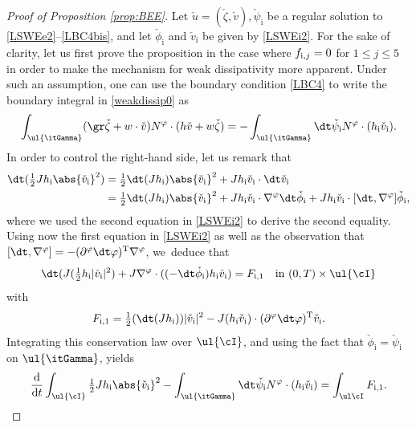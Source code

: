 \begin{proof}[Proof of Proposition \ref{prop:BEE}]
Let $\check{u}=(\check{\zeta},\check{v}), \check{\psi}_\mathrm{i}$ be a regular solution to \eqref{LSWEe2}--\eqref{LBC4bis},
and let $\check{\phi}_\mathrm{i}$ and $\check{v}_\mathrm{i}$ be given by \eqref{LSWEi2}.
For the sake of clarity, let us first prove the proposition in the case where $f_{{\rm i},j}=0$ for $1\leq j\leq 5$
in order to make the mechanism for weak dissipativity more apparent.
Under such an assumption, one can use the boundary condition \eqref{LBC4} to write the boundary integral in \eqref{weakdissip0} as
\begin{equation}\label{weakdissip1}
\int_{\ul{\itGamma}} (\gr \check{\zeta}+w\cdot\check{v})N^\varphi\cdot (h \check{v}+w\check{\zeta})
= -\int_{\ul{\itGamma}} \dt \check{\psi}_\mathrm{i} N^\varphi\cdot (h_\mathrm{i}\check{v}_\mathrm{i}).
\end{equation}
In order to control the right-hand side, let us remark that
\begin{align*}
\dt (\tfrac{1}{2}Jh_\mathrm{i}\abs{\check{v}_\mathrm{i}}^2)
&= \tfrac{1}{2}\dt(J h_\mathrm{i}) \abs{\check{v}_\mathrm{i}}^2+J h_\mathrm{i}\check{v}_\mathrm{i}\cdot \dt \check{v}_\mathrm{i} \\
&= \tfrac{1}{2}\dt(J h_\mathrm{i}) \abs{\check{v}_\mathrm{i}}^2+J h_\mathrm{i}\check{v}_\mathrm{i}\cdot \nabla^\varphi \dt \check{\phi}_\mathrm{i}
+ J h_\mathrm{i}\check{v}_\mathrm{i}\cdot [\dt,\nabla^\varphi] \check{\phi}_\mathrm{i},
\end{align*}
where we used the second equation in \eqref{LSWEi2} to derive the second equality.
Using now the first equation in \eqref{LSWEi2} as well as the observation that $[\dt,\nabla^\varphi]=-(\partial^\varphi\dt\varphi)^\mathrm{T}\nabla^\varphi$, we~deduce that
\begin{equation}\label{weakdissip2}
\dt(J(\tfrac12h_\mathrm{i}|\check{v}_\mathrm{i}|^2)
+ J\nabla^\varphi\cdot((-\dt\check{\phi}_\mathrm{i})h_\mathrm{i}\check{v}_\mathrm{i}) = F_{{\rm i},1} \quad\text{in } (0,T)\times\ul{\cI}
\end{equation}
with
\[
F_{{\rm i},1} = \tfrac12(\dt(Jh_\mathrm{i}))|\check{v}_\mathrm{i}|^2 - J(h_\mathrm{i}\check{v}_\mathrm{i})\cdot (\partial^\varphi\dt\varphi)^\mathrm{T}\check{v}_\mathrm{i}.
\]
Integrating this conservation law over $\ul{\cI}$, and using the fact that $\check{\phi}_\mathrm{i}=\check{\psi}_\mathrm{i}$ on $\ul{\itGamma}$, yields
\[
\frac{{\rm d}}{{\rm d}t} \int_{\ul{\cI}} \tfrac12 J h_\mathrm{i}\abs{\check{v}_\mathrm{i}}^2
- \int_{\ul{\itGamma}} \dt \check{\psi}_\mathrm{i} N^\varphi\cdot (h_\mathrm{i}\check{v}_\mathrm{i}) = \int_{\ul\cI}F_\mathrm{i,1}.
\]
\end{proof}
